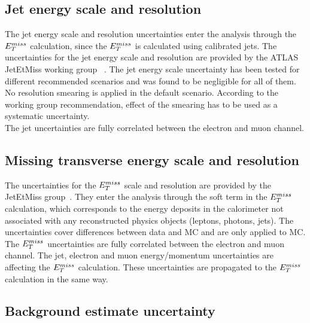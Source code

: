 \subsection{Jet energy scale and resolution}
The jet energy scale and resolution uncertainties enter the analysis through 
the $E_T^{miss}$ calculation, since the $E_T^{miss}$ is calculated using calibrated jets. 
The uncertainties for the jet energy scale and resolution are provided 
by the ATLAS JetEtMiss working group ~\cite{jet_calib_syst_13TeV, JESUncer13TeV}. 
The jet energy scale uncertainty has been tested for different recommended scenarios 
and was found to be negligible for all of them.\\
No resolution smearing is applied in the default scenario. 
According to the working group recommendation, effect of the smearing has to be used as a systematic uncertainty.\\ The jet uncertainties are fully correlated between the electron and muon channel.

\subsection{Missing transverse energy scale and resolution}
The uncertainties for the $E_T^{miss}$ scale and resolution are provided by the JetEtMiss group~\cite{met2015_1}. They enter
the analysis through the soft term in the $E_T^{miss}$ calculation, 
which corresponds to the energy deposits in the calorimeter not associated with
any reconstructed physics objects (leptons, photons, jets).
The uncertainties cover differences between data and MC and are only applied to MC. 
The $E_T^{miss}$ uncertainties are fully correlated between the electron and muon channel. 
The jet, electron and muon energy/momentum uncertainties are affecting the $E_T^{miss}$
calculation. These uncertainties are propagated to the $E_T^{miss}$ calculation in the same way.

\subsection{Background estimate uncertainty}

